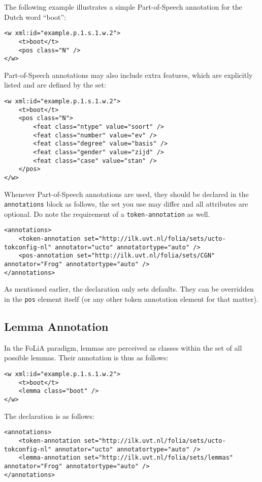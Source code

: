 \documentclass[a4paper,12pt]{article}
\begin{document}
The following example illustrates a simple Part-of-Speech annotation for the Dutch word ``boot'':

\begin{verbatim}
<w xml:id="example.p.1.s.1.w.2">
    <t>boot</t>
    <pos class="N" />
</w>
\end{verbatim}

Part-of-Speech annotations may also include extra features, which are explicitly listed and are defined by the set:

\begin{verbatim}
<w xml:id="example.p.1.s.1.w.2">
    <t>boot</t>
    <pos class="N">
        <feat class="ntype" value="soort" />
        <feat class="number" value="ev" />
        <feat class="degree" value="basis" />
        <feat class="gender" value="zijd" />
        <feat class="case" value="stan" />
    </pos>
</w>
\end{verbatim}

Whenever Part-of-Speech annotations are used, they should be declared in the \texttt{annotations} block as follows, the set you use may differ and all attributes are optional. Do note the requirement of a \texttt{token-annotation} as well.

\begin{verbatim}
<annotations>
    <token-annotation set="http://ilk.uvt.nl/folia/sets/ucto-tokconfig-nl" annotator="ucto" annotatortype="auto" />
    <pos-annotation set="http://ilk.uvt.nl/folia/sets/CGN" annotator="Frog" annotatortype="auto" />
</annotations>
\end{verbatim}

As mentioned earlier, the declaration only sets defaults. They can be overridden in the \texttt{pos} element itself (or any other token annotation element for that matter).

\subsection{Lemma Annotation}

In the FoLiA paradigm, lemmas are perceived as classes within the set of all possible lemmas. Their annotation is thus as follows:

\begin{verbatim}
<w xml:id="example.p.1.s.1.w.2">
    <t>boot</t>
    <lemma class="boot" />
</w>
\end{verbatim}

The declaration is as follows:

\begin{verbatim}
<annotations>
    <token-annotation set="http://ilk.uvt.nl/folia/sets/ucto-tokconfig-nl" annotator="ucto" annotatortype="auto" />
    <lemma-annotation set="http://ilk.uvt.nl/folia/sets/lemmas" annotator="Frog" annotatortype="auto" />
</annotations>
\end{verbatim}
\end{document}
